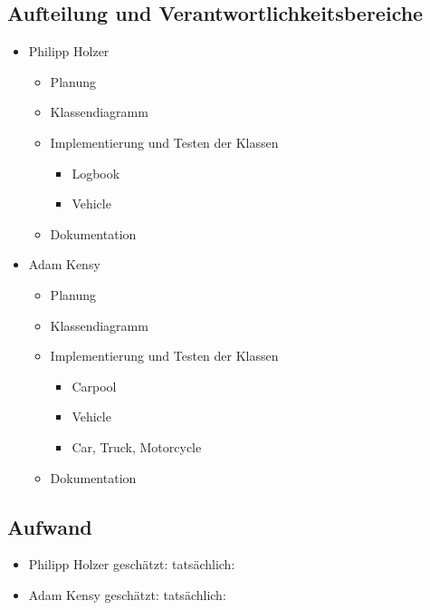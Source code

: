 \subsection{Aufteilung und Verantwortlichkeitsbereiche}
\begin{itemize}
	\item Philipp Holzer
		\begin{itemize}
		\item Planung
		\item Klassendiagramm
		\item Implementierung und Testen der Klassen
			\begin{itemize}
			\item Logbook
			\item Vehicle
			\end{itemize}
		\item Dokumentation
		\end{itemize}
	\item Adam Kensy
		\begin{itemize}
		\item Planung
		\item Klassendiagramm
		\item Implementierung und Testen der Klassen
			\begin{itemize}
			\item Carpool
			\item Vehicle
			\item Car, Truck, Motorcycle
			\end{itemize}
		\item Dokumentation
		\end{itemize}
\end{itemize}

\subsection{Aufwand}
\begin{itemize}
	\item Philipp Holzer		\tab geschätzt:		\tab tatsächlich:
	\item Adam Kensy		\tab  geschätzt:		\tab  tatsächlich:
\end{itemize}



